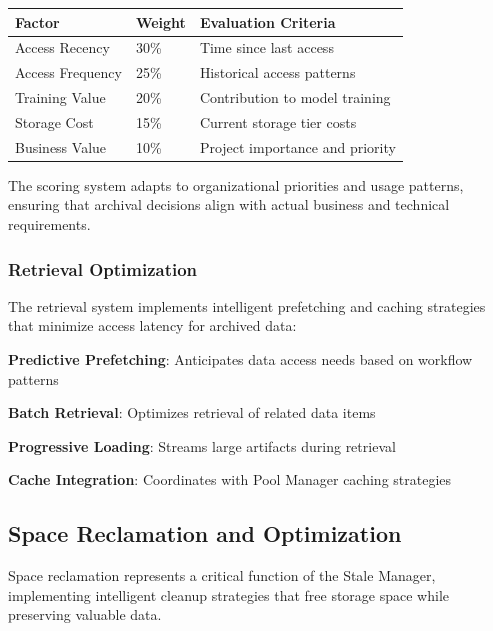 \begin{center}
\begin{tabular}{@{}lll@{}}
\toprule
\textbf{Factor} & \textbf{Weight} & \textbf{Evaluation Criteria} \\
\midrule
Access Recency & 30\% & Time since last access \\
Access Frequency & 25\% & Historical access patterns \\
Training Value & 20\% & Contribution to model training \\
Storage Cost & 15\% & Current storage tier costs \\
Business Value & 10\% & Project importance and priority \\
\bottomrule
\end{tabular}
\end{center}

The scoring system adapts to organizational priorities and usage patterns, ensuring that archival decisions align with actual business and technical requirements.

\subsubsection*{Retrieval Optimization}

The retrieval system implements intelligent prefetching and caching strategies that minimize access latency for archived data:

\begin{compactlist}
    \item \textbf{Predictive Prefetching}: Anticipates data access needs based on workflow patterns
    \item \textbf{Batch Retrieval}: Optimizes retrieval of related data items
    \item \textbf{Progressive Loading}: Streams large artifacts during retrieval
    \item \textbf{Cache Integration}: Coordinates with Pool Manager caching strategies
\end{compactlist}

\subsection*{Space Reclamation and Optimization}

Space reclamation represents a critical function of the Stale Manager, implementing intelligent cleanup strategies that free storage space while preserving valuable data.

